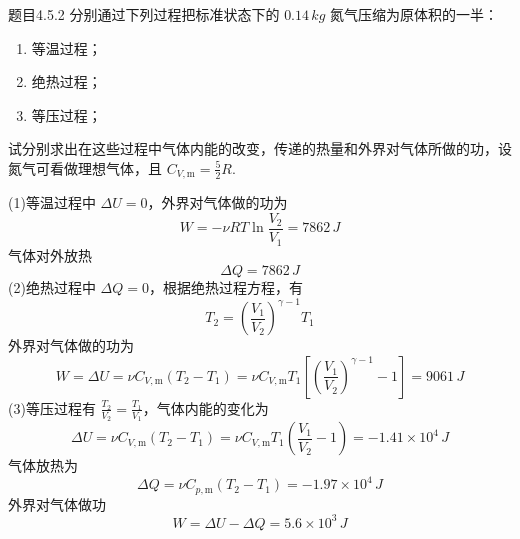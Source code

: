 \begin{question}{题目4.5.2}
    分别通过下列过程把标准状态下的 $0.14 \,\si{kg}$ 氮气压缩为原体积的一半：
    \begin{enumerate}
        \item[(1)] 等温过程；
        \item[(2)] 绝热过程；
        \item[(3)] 等压过程；
    \end{enumerate}
    试分别求出在这些过程中气体内能的改变，传递的热量和外界对气体所做的功，设氮气可看做理想气体，且 $C_{V,\mathrm{m}} = \frac{5}{2}R$.
\end{question}
\begin{solution}
    (1)等温过程中 $\Delta{U} = 0$，外界对气体做的功为
    $$
        W = - \nu RT \ln \frac{V_2}{V_1} = 7862 \,\si{J}
    $$
    气体对外放热
    $$
        \Delta{Q} = 7862 \,\si{J}
    $$
    (2)绝热过程中 $\Delta{Q} = 0$，根据绝热过程方程，有
    $$
        T_2 = \left(\frac{V_1}{V_2}\right)^{\gamma - 1} T_1
    $$
    外界对气体做的功为
    $$
        W = \Delta{U} = \nu C_{V,\mathrm{m}} (T_2 - T_1)
        = \nu C_{V,\mathrm{m}}T_1\left[ \left(\frac{V_1}{V_2}\right)^{\gamma - 1} - 1 \right]
        = 9061 \,\si{J}
    $$
    (3)等压过程有 $\frac{T_2}{V_2} = \frac{T_1}{V_1}$，气体内能的变化为
    $$
        \Delta{U}
        = \nu C_{V,\mathrm{m}} (T_2 - T_1)
        = \nu C_{V,\mathrm{m}} T_1 \left( \frac{V_1}{V_2} - 1 \right)
        = -1.41 \times 10^4 \,\si{J}
    $$
    气体放热为
    $$
        \Delta{Q} = \nu C_{p,\mathrm{m}} (T_2 - T_1) = -1.97 \times 10^4 \,\si{J}
    $$
    外界对气体做功
    $$
        W = \Delta{U} - \Delta{Q} = 5.6 \times 10^3 \,\si{J}
    $$
\end{solution}

